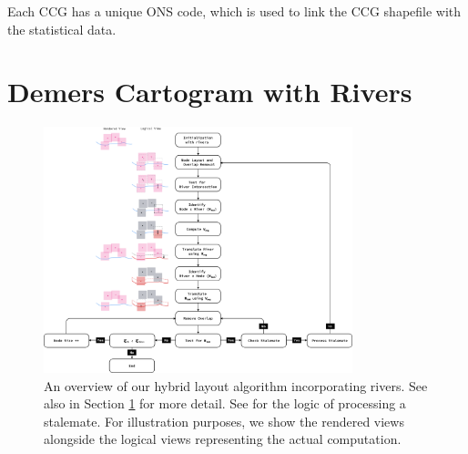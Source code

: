 \documentclass[Afour,sagev,times]{sagej}
\begin{document}
Each CCG has a unique ONS code, which is used to link the CCG shapefile with the statistical data.

\section{Demers Cartogram with Rivers}
\label{sec:main}

{
    \begin{figure}[tb!]
        \centering
        \includegraphics[width=0.8\textwidth,height=\textheight,keepaspectratio]{flowchart.png}
        \caption{An overview of our hybrid layout algorithm incorporating rivers. See also  in Section \ref{sec:main} for more detail. See  for the logic of processing a stalemate.
            For illustration purposes, we show the rendered views alongside the logical views representing the actual computation.}
        \label{fig:flowchart}
    \end{figure}
}
\end{document}
